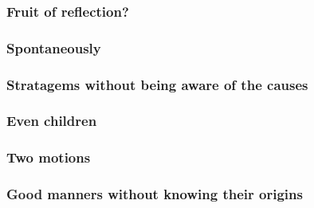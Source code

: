         \subsubsection{Fruit of reflection?}

            \begin{quote}
                
            \end{quote}

        \subsubsection{Spontaneously}

            \begin{quote}
                
            \end{quote}

        \subsubsection{Stratagems without being aware of the causes}

            \begin{quote}
                
            \end{quote}

        \subsubsection{Even children}

            \begin{quote}
                
            \end{quote}

        \subsubsection{Two motions}

            \begin{quote}
                
            \end{quote}

        \subsubsection{Good manners without knowing their origins}

